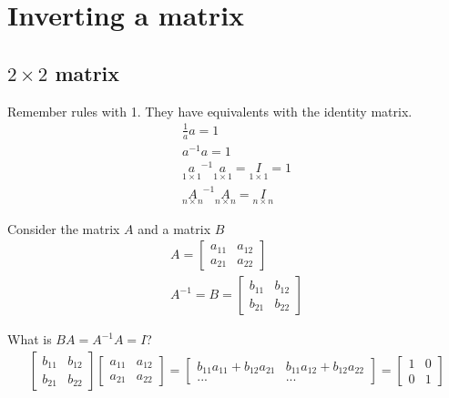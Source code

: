 \documentclass{article}
\begin{document}
\section{Inverting a matrix}

\subsection{$2 \times 2$ matrix}

Remember rules with 1. They have equivalents with the identity matrix. 
\begin{align}
    \frac{1}{a} a = 1\\
    a^{-1}a = 1 \\
    \underset{1 \times 1}a^{-1} \underset{1 \times 1}a = \underset{1 \times 1}I = 1\\
    \underset{n \times n}A^{-1} \underset{n \times n}A = \underset{n \times n}I
\end{align}

Consider the matrix $A$ and a matrix $B$ 
\begin{align}
    A = \begin{bmatrix}
        a_{11} & a_{12} \\
        a_{21} & a_{22}
    \end{bmatrix}\\
    A^{-1} = B = \begin{bmatrix}
        b_{11} & b_{12} \\
        b_{21} & b_{22}
    \end{bmatrix}
\end{align}

What is $BA = A^{-1}A = I$?
\begin{align}
    \begin{bmatrix}
        b_{11} & b_{12} \\
        b_{21} & b_{22}
    \end{bmatrix}
    \begin{bmatrix}
        a_{11} & a_{12} \\
        a_{21} & a_{22}
    \end{bmatrix}
    =     \begin{bmatrix}
        b_{11}a_{11} + b_{12}a_{21} & b_{11}a_{12} + b_{12}a_{22} \\
        ... & ...
    \end{bmatrix} = 
    \begin{bmatrix}
        1 & 0 \\
        0 & 1
    \end{bmatrix}
\end{align}
\end{document}
